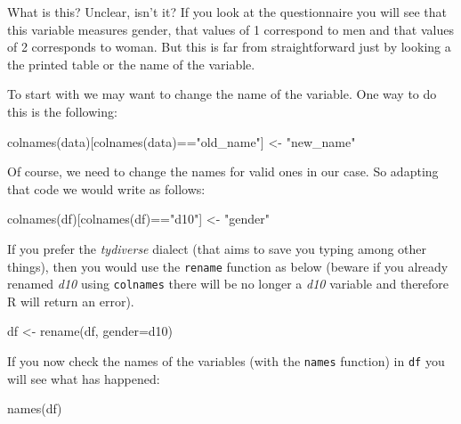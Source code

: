 \documentclass[
]{book}
\newenvironment{Shaded}{\begin{snugshade}}{\end{snugshade}}
\newcommand{\AttributeTok}[1]{\textcolor[rgb]{0.77,0.63,0.00}{#1}}
\newcommand{\FunctionTok}[1]{\textcolor[rgb]{0.00,0.00,0.00}{#1}}
\newcommand{\NormalTok}[1]{#1}
\newcommand{\OtherTok}[1]{\textcolor[rgb]{0.56,0.35,0.01}{#1}}
\newcommand{\SpecialCharTok}[1]{\textcolor[rgb]{0.00,0.00,0.00}{#1}}
\newcommand{\StringTok}[1]{\textcolor[rgb]{0.31,0.60,0.02}{#1}}
\begin{document}
What is this? Unclear, isn't it? If you look at the questionnaire you will see that this variable measures gender, that values of 1 correspond to men and that values of 2 corresponds to woman. But this is far from straightforward just by looking a the printed table or the name of the variable.

To start with we may want to change the name of the variable. One way to do this is the following:

\begin{Shaded}
\begin{Highlighting}[]
\FunctionTok{colnames}\NormalTok{(data)[}\FunctionTok{colnames}\NormalTok{(data)}\SpecialCharTok{==}\StringTok{"old\_name"}\NormalTok{] }\OtherTok{\textless{}{-}} \StringTok{"new\_name"}
\end{Highlighting}
\end{Shaded}

Of course, we need to change the names for valid ones in our case. So adapting that code we would write as follows:

\begin{Shaded}
\begin{Highlighting}[]
\FunctionTok{colnames}\NormalTok{(df)[}\FunctionTok{colnames}\NormalTok{(df)}\SpecialCharTok{==}\StringTok{"d10"}\NormalTok{] }\OtherTok{\textless{}{-}} \StringTok{"gender"}
\end{Highlighting}
\end{Shaded}

If you prefer the \emph{tydiverse} dialect (that aims to save you typing among other things), then you would use the \texttt{rename} function as below (beware if you already renamed \emph{d10} using \texttt{colnames} there will be no longer a \emph{d10} variable and therefore R will return an error).

\begin{Shaded}
\begin{Highlighting}[]
\NormalTok{df }\OtherTok{\textless{}{-}} \FunctionTok{rename}\NormalTok{(df, }\AttributeTok{gender=}\NormalTok{d10)}
\end{Highlighting}
\end{Shaded}

If you now check the names of the variables (with the \texttt{names} function) in \texttt{df} you will see what has happened:

\begin{Shaded}
\begin{Highlighting}[]
\FunctionTok{names}\NormalTok{(df)}
\end{Highlighting}
\end{Shaded}
\end{document}
